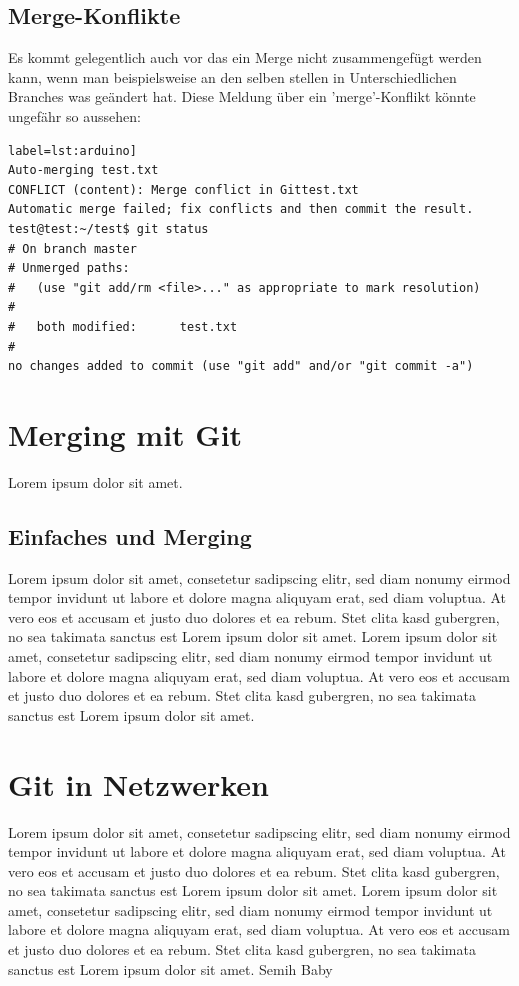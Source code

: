 \documentclass[12pt,a4paper,bibliography=totocnumbered,listof=totocnumbered]{scrartcl}
\begin{document}
\subsection{Merge-Konflikte}
Es kommt gelegentlich auch vor das ein Merge nicht zusammengefügt werden kann, wenn man beispielsweise an den selben stellen in Unterschiedlichen Branches was geändert hat.	
Diese Meldung über ein 'merge'-Konflikt könnte ungefähr so aussehen:
\begin{lstlisting}[caption=Branch Konfilkt] label=lst:arduino]
Auto-merging test.txt
CONFLICT (content): Merge conflict in Gittest.txt
Automatic merge failed; fix conflicts and then commit the result.
test@test:~/test$ git status
# On branch master
# Unmerged paths:
#   (use "git add/rm <file>..." as appropriate to mark resolution)
#
#	both modified:      test.txt
#
no changes added to commit (use "git add" and/or "git commit -a")
\end{lstlisting}





\section{Merging mit Git}
Lorem ipsum dolor sit amet.

\subsection{Einfaches und Merging}
Lorem ipsum dolor sit amet, consetetur sadipscing elitr, sed diam nonumy eirmod tempor invidunt ut labore et dolore magna aliquyam erat, sed diam voluptua. At vero eos et accusam et justo duo dolores et ea rebum. Stet clita kasd gubergren, no sea takimata sanctus est Lorem ipsum dolor sit amet. Lorem ipsum dolor sit amet, consetetur sadipscing elitr, sed diam nonumy eirmod tempor invidunt ut labore et dolore magna aliquyam erat, sed diam voluptua. At vero eos et accusam et justo duo dolores et ea rebum. Stet clita kasd gubergren, no sea takimata sanctus est Lorem ipsum dolor sit amet.
\pagebreak
\section{Git in Netzwerken}
Lorem ipsum dolor sit amet, consetetur sadipscing elitr, sed diam nonumy eirmod tempor invidunt ut labore et dolore magna aliquyam erat, sed diam voluptua. At vero eos et accusam et justo duo dolores et ea rebum. Stet clita kasd gubergren, no sea takimata sanctus est Lorem ipsum dolor sit amet. Lorem ipsum dolor sit amet, consetetur sadipscing elitr, sed diam nonumy eirmod tempor invidunt ut labore et dolore magna aliquyam erat, sed diam voluptua. At vero eos et accusam et justo duo dolores et ea rebum. Stet clita kasd gubergren, no sea takimata sanctus est Lorem ipsum dolor sit amet. Semih Baby
\end{document}
